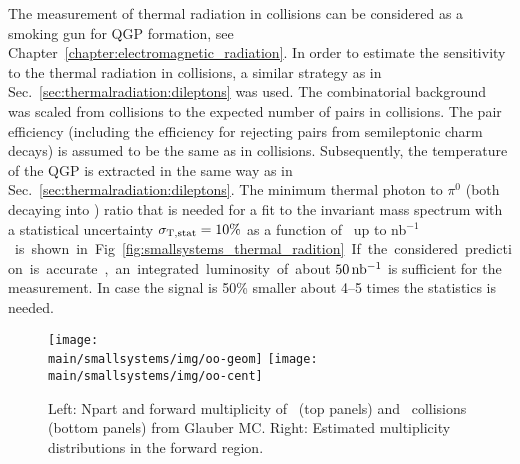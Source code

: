 \documentclass[../report.tex]{subfiles}
\providecommand{\main}{..}
\begin{document}
The measurement of thermal radiation in \pPb collisions can be considered as a smoking gun for QGP formation, see Chapter~\ref{chapter:electromagnetic_radiation}. In order to estimate the sensitivity to the thermal radiation in \pPb collisions, a similar strategy as in Sec.~\ref{sec:thermalradiation:dileptons} was used.
The combinatorial background was scaled from \PbPb collisions to the expected number of pairs in \pPb collisions. The pair efficiency (including the efficiency for rejecting \Pepem pairs from semileptonic charm decays) is assumed to be the same as in \PbPb collisions.
Subsequently, the temperature of the QGP is extracted in the same way as in Sec.~\ref{sec:thermalradiation:dileptons}. The minimum thermal photon to $\pi^{0}$ (both decaying into \Pepem) ratio that is needed for a fit to the invariant mass spectrum with a statistical uncertainty $\sigma_{\rm T,stat} = 10\%$ as a function of \Lint\ up to \unit[2000]{nb$^{-1}$} is shown in Fig.~\ref{fig:smallsystems_thermal_radition}. If the considered prediction is accurate, an integrated luminosity of about $\unit[50]{nb^{-1}}$ is sufficient for the measurement. In case the signal is 50\% smaller about 4--5 times the statistics is needed.

\begin{figure}[t]
\centering
\texttt{[image: \\main/smallsystems/img/oo-geom]}
\hspace{0.5cm}
\texttt{[image: \\main/smallsystems/img/oo-cent]}
\caption{Left: Npart and forward multiplicity of \OO\ (top panels) and \pPb\ collisions (bottom panels) from Glauber MC. Right: Estimated multiplicity distributions in the forward region.}
\label{fig:smallsystems_oopot}
\end{figure}
\end{document}
